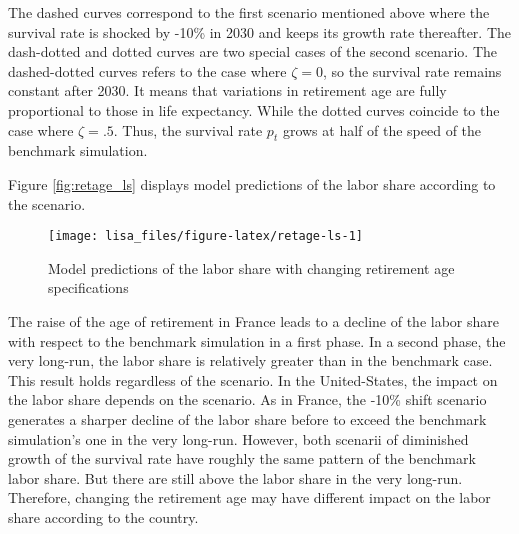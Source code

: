 \documentclass[
]{article}
\begin{document}
The dashed curves correspond to the first scenario mentioned above where the survival rate is shocked by -10\% in 2030 and keeps its growth rate thereafter. The dash-dotted and dotted curves are two special cases of the second scenario. The dashed-dotted curves refers to the case where \(\zeta = 0\), so the survival rate remains constant after 2030. It means that variations in retirement age are fully proportional to those in life expectancy. While the dotted curves coincide to the case where \(\zeta = .5\). Thus, the survival rate \(p_t\) grows at half of the speed of the benchmark simulation.

Figure \ref{fig:retage_ls} displays model predictions of the labor share according to the scenario.

\begin{figure}[!tb]

{\centering \texttt{[image: lisa\_files/figure-latex/retage-ls-1]} 

}

\caption{Model predictions of the labor share with changing retirement age specifications}\label{fig:retage-ls}
\end{figure}

The raise of the age of retirement in France leads to a decline of the labor share with respect to the benchmark simulation in a first phase. In a second phase, the very long-run, the labor share is relatively greater than in the benchmark case. This result holds regardless of the scenario. In the United-States, the impact on the labor share depends on the scenario. As in France, the -10\% shift scenario generates a sharper decline of the labor share before to exceed the benchmark simulation's one in the very long-run. However, both scenarii of diminished growth of the survival rate have roughly the same pattern of the benchmark labor share. But there are still above the labor share in the very long-run. Therefore, changing the retirement age may have different impact on the labor share according to the country.
\end{document}
